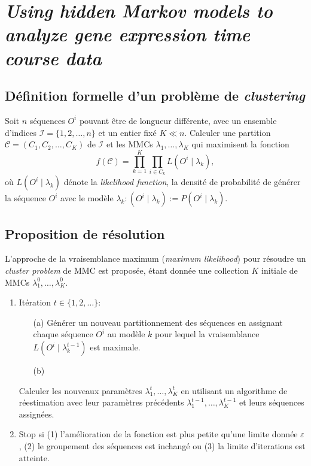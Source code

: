 \documentclass[a4paper, 11pt]{article}
\begin{document}
\section{\textit{Using hidden Markov models to analyze gene expression time course data}}
\subsection{Définition formelle d'un problème de \textit{clustering}}
Soit $n$ séquences $O^i$ pouvant être de longueur différente, avec un ensemble d'indices $ \mathcal{I} = \{1,2,\dotsc ,n\}$ et un entier fixé $K \ll n$. Calculer une partition $\mathcal{C} = (C_1,C_2,\dotsc ,C_K)$ de $\mathcal{I}$ et les MMCs $\lambda_1,\dotsc ,\lambda_K$ qui maximisent la fonction
\begin{equation}
f(\mathcal{C}) = \prod_{k=1}^{K}\prod_{i\in C_k} L(O^i \mid \lambda_k),
\end{equation}
où $L(O^i \mid \lambda_k)$ dénote la \textit{likelihood function}, la densité de probabilité de générer la séquence $O^i$ avec le modèle $\lambda_k : (O^i \mid \lambda_k) := P(O^i \mid \lambda_k)$.
\subsection{Proposition de résolution}
L'approche de la vraisemblance maximum (\textit{maximum likelihood}) pour résoudre un \textit{cluster problem} de MMC est proposée, étant donnée une collection $K$ initiale de MMCs $\lambda_1^0,\dotsc ,\lambda_K^0$.
\begin{enumerate}
	\item Itération $t\in \{1,2,\dotsc\} :$
	\begin{itemize}
		\item[(a)] Générer un nouveau partitionnement des séquences en assignant chaque séquence $O^i$ au modèle $k$ pour lequel la vraisemblance $L(O^i\mid \lambda_k^{t-1})$ est maximale. 
		\item[(b)]
	\end{itemize} Calculer les nouveaux paramètres $\lambda_1^t,\dotsc ,\lambda_K^t$ en utilisant un algorithme de réestimation avec leur paramètres précédents $\lambda_1^{t-1},\dotsc ,\lambda_K^{t-1}$ et leurs séquences assignées.
	\item Stop si (1) l'amélioration de la fonction est plus petite qu'une limite donnée $\varepsilon$, (2) le groupement des séquences est inchangé ou (3) la limite d'iterations est atteinte.
\end{enumerate}
\end{document}
